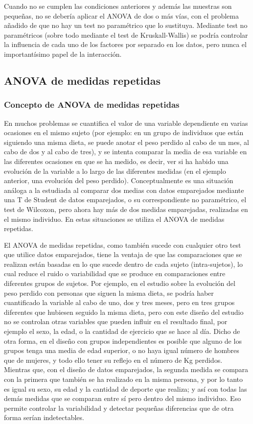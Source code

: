Cuando no se cumplen las condiciones anteriores y además las muestras son pequeñas, no se debería aplicar el ANOVA de dos o más vías, con el
problema añadido de que no hay un test no paramétrico que lo sustituya. Mediante test no paramétricos (sobre todo mediante el test de
Kruskall-Wallis) se podría controlar la influencia de cada uno de los factores por separado en los datos, pero nunca el importantísimo papel
de la interacción.


\subsection{ANOVA de medidas repetidas}

\subsubsection{Concepto de ANOVA de medidas repetidas}
En muchos problemas se cuantifica el valor de una variable dependiente en varias ocasiones en el mismo sujeto (por ejemplo: en un grupo de
individuos que están siguiendo una misma dieta, se puede anotar el peso perdido al cabo de un mes, al cabo de dos y al cabo de tres), y se
intenta comparar la media de esa variable en las diferentes ocasiones en que se ha medido, es decir, ver si ha habido una evolución de la
variable a lo largo de las diferentes medidas (en el ejemplo anterior, una evolución del peso perdido). Conceptualmente es una situación
análoga a la estudiada al comparar dos medias con datos emparejados mediante una T de Student de datos emparejados, o su correspondiente no
paramétrico, el test de Wilcoxon, pero ahora hay más de dos medidas emparejadas, realizadas en el mismo individuo. En estas situaciones se
utiliza el ANOVA de medidas repetidas.

El ANOVA de medidas repetidas, como también sucede con cualquier otro test que utilice datos emparejados, tiene la ventaja de que las
comparaciones que se realizan están basadas en lo que sucede dentro de cada sujeto (intra-sujetos), lo cual reduce el ruido o variabilidad
que se produce en comparaciones entre diferentes grupos de sujetos. Por ejemplo, en el estudio sobre la evolución del peso perdido con
personas que siguen la misma dieta, se podría haber cuantificado la variable al cabo de uno, dos y tres meses, pero en tres grupos
diferentes que hubiesen seguido la misma dieta, pero con este diseño del estudio no se controlan otras variables que pueden influir en el
resultado final, por ejemplo el sexo, la edad, o la cantidad de ejercicio que se hace al día. Dicho de otra forma, en el diseño con grupos
independientes es posible que alguno de los grupos tenga una media de edad superior, o no haya igual número de hombres que de mujeres, y
todo ello tener su reflejo en el número de Kg perdidos. Mientras que, con el diseño de datos emparejados, la segunda medida se compara con
la primera que también se ha realizado en la misma persona, y por lo tanto es igual su sexo, su edad y la cantidad de deporte que realiza; y
así con todas las demás medidas que se comparan entre sí pero dentro del mismo individuo. Eso permite controlar la variabilidad y detectar
pequeñas diferencias que de otra forma serían indetectables.

